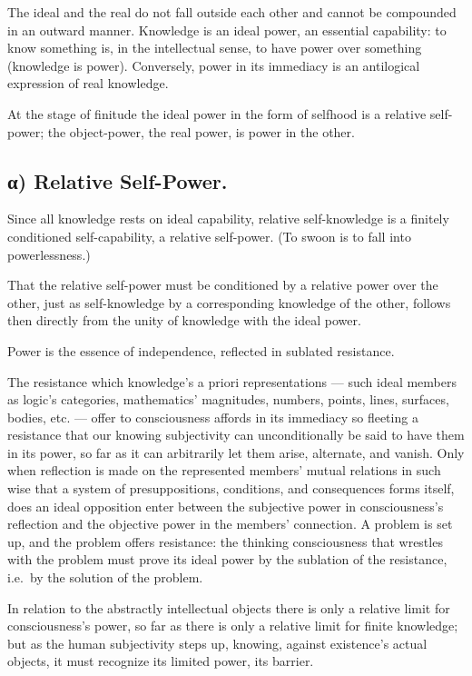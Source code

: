 \documentclass[12pt]{book}
\begin{document}
The ideal and the real do not fall outside each other and cannot be
compounded in an outward manner. Knowledge is an ideal power, an
essential capability: to know something
is, in the intellectual sense, to have power over something
(knowledge is power). Conversely, power in its immediacy is an
antilogical expression of real knowledge.

At the stage of finitude the ideal power in the form of selfhood is
a relative self-power; the object-power, the real power, is power in
the other.

\subsection*{α) Relative Self-Power.}

Since all knowledge rests on ideal capability, relative
self-knowledge is a finitely conditioned self-capability, a relative
self-power. (To swoon is to fall into powerlessness.)

That the relative self-power must be conditioned by a relative power
over the other, just as self-knowledge by a corresponding knowledge
of the other, follows then directly from the unity of knowledge with
the ideal power.

Power is the essence of independence, reflected in sublated
resistance.

The resistance which knowledge's a priori representations --- such
ideal members as logic's categories, mathematics' magnitudes,
numbers, points, lines, surfaces, bodies, etc. --- offer to
consciousness affords in its immediacy so fleeting a resistance that
our knowing subjectivity can unconditionally be said to have them in
its power, so far as it can arbitrarily let them arise, alternate,
and vanish. Only when reflection is made on the represented members'
mutual relations in such wise that a system of presuppositions,
conditions, and consequences forms itself, does an ideal opposition
enter between the subjective power in consciousness's reflection and
the objective power in the members' connection. A problem is set up,
and the problem offers resistance: the thinking consciousness that
wrestles with the problem must prove its ideal power by the
sublation of the resistance, i.e.\ by the solution of the problem.

In relation to the abstractly intellectual objects there is only a
relative limit for consciousness's power, so far as
there is only a relative limit for finite knowledge; but as the
human subjectivity steps up, knowing, against existence's actual
objects, it must recognize its limited power, its barrier.
\end{document}
